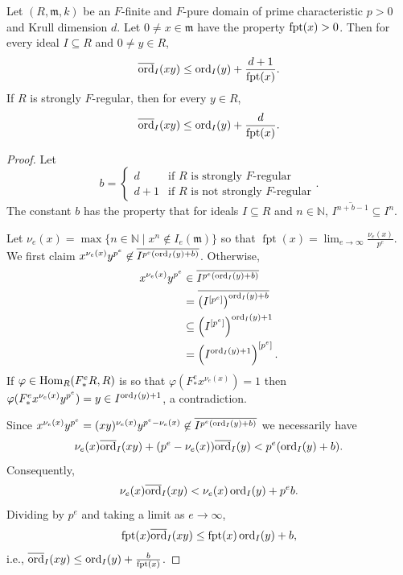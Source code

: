 \documentclass[12pt]{amsart}
\numberwithin{equation}{theorem}
\theoremstyle{plain}
\newcommand{\fm}{\mathfrak{m}}
\newcommand{\NN}{\mathbb{N}}
\DeclareMathOperator{\FPT}{fpt}
\begin{document}
\begin{lemma}
    \label{lem: valution bound via fpt}
    Let $(R,\fm,k)$ be an $F$-finite and $F$-pure domain of prime characteristic $p>0$ and Krull dimension $d$. Let $0\not=x\in \fm$ have the property $\operatorname{{fpt}}(x)>0$. Then for every ideal $I\subseteq R$ and $0\not=y\in R$,
    \[
    \overline{\operatorname{{ord}}}_I(xy)\leq \operatorname{{ord}}_I(y) + \frac{d+1}{\operatorname{{fpt}}(x)}.
    \]
    If $R$ is strongly $F$-regular, then
    for every $y\in R$,
    \[
    \overline{\operatorname{{ord}}}_I(xy)\leq \operatorname{{ord}}_I(y) + \frac{d}{\operatorname{{fpt}}(x)}.
    \]
\end{lemma}
\begin{proof}
    Let
    \[
    b = \begin{cases}
        d & \mbox{if $R$ is strongly $F$-regular}\\
        d+1 & \mbox{if $R$ is not strongly $F$-regular}
    \end{cases}.
    \]
    The constant $b$ has the property that for ideals $I\subseteq R$ and $n\in\NN$, $\overline{I^{n+b-1}}\subseteq I^n$. 
    
    Let $\nu_e(x) = \max\{n\in\NN\mid x^n\not\in I_e(\fm)\}$ so that $\FPT(x) = \lim_{e\to\infty}\frac{\nu_e(x)}{p^e}$. We first claim $x^{\nu_e(x)}y^{p^e}\not\in \overline{I^{p^e(\operatorname{{ord}}_{I}(y)+b)}}$. Otherwise,
    \begin{align*}
        x^{\nu_e(x)}y^{p^e} &\in \overline{I^{p^e(\operatorname{{ord}}_{I}(y)+b)}} \\ 
        &= \overline{\left(I^{[p^e]}\right)^{\operatorname{{ord}}_I(y)+b}}\\
        &\subseteq \left(I^{[p^e]}\right)^{\operatorname{{ord}}_I(y)+1}\\
        &= \left(I^{\operatorname{{ord}}_I(y)+1}\right)^{[p^e]}.
    \end{align*}
    If $\varphi\in\operatorname{Hom}_R(F^e_*R,R)$ is so that $\varphi(F^e_*x^{\nu_e(x)})=1$ then $\varphi(F^{e}_*x^{\nu_e(x)}y^{p^e}) = y\in I^{\operatorname{{ord}}_{I}(y)+1}$, a contradiction. 
    
    Since $x^{\nu_e(x)}y^{p^e} = (xy)^{\nu_e(x)}y^{p^e-\nu_e(x)}\not\in \overline{I^{p^e(\operatorname{{ord}}_{I}(y)+b)}}$ we necessarily have 
    \[
    \nu_e(x)\overline{\operatorname{{ord}}}_{I}(xy) + (p^e-\nu_e(x))\overline{\operatorname{{ord}}}_{I}(y)<p^e(\operatorname{{ord}}_{I}(y)+b).
    \]
    Consequently,
    \[
    \nu_e(x)\overline{\operatorname{{ord}}}_{I}(xy)<\nu_e(x)\operatorname{{ord}}_{I}(y) + p^eb.
    \]
    Dividing by $p^e$ and taking a limit as $e\to \infty$,
    \[
    \operatorname{{fpt}}(x)\overline{\operatorname{{ord}}}_{I}(xy)\leq \operatorname{{fpt}}(x)\operatorname{{ord}}_{I}(y) + b,
    \]
    i.e., $\overline{\ord}_{I}(xy)\leq \ord_{I}(y) +\frac{b}{\FPT(x)}$.
\end{proof}
\end{document}
